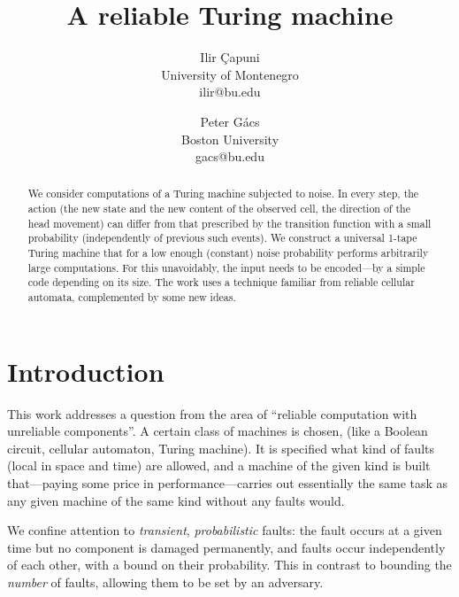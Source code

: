 \documentclass[11pt]{memoir}
\theoremstyle{definition} %
\begin{document}
\title{A reliable Turing machine}

\author{Ilir \c{C}apuni 
\\ University of Montenegro
\\ ilir@bu.edu
\and
Peter G\'acs
\\ Boston University
\\ gacs@bu.edu
}
\maketitle

\begin{abstract}
  We consider computations of a Turing machine subjected to noise.
  In every step, the action (the new state and the new content of the observed
  cell, the direction of the head movement) can differ from that prescribed by
  the transition function with a small probability (independently of previous
  such events).  We construct a universal 1-tape Turing machine that for a low enough
  (constant) noise probability performs arbitrarily large computations.  For
  this unavoidably, the input needs to be encoded---by a simple code depending
  on its size.  The work uses a technique familiar from reliable cellular
  automata, complemented by some new ideas.
\end{abstract}

\newpage


\section{Introduction}

This work addresses a question from the area of ``reliable computation with unreliable components''.
A certain class of machines is chosen, (like a Boolean circuit, cellular automaton, Turing machine).
It is specified what kind of faults (local in space and time)
are allowed, and a machine of the given
kind is built that---paying some price in performance---carries out essentially the same
task as any given machine of the same kind without any faults would.

We confine attention to \emph{transient}, \emph{probabilistic} faults:
the fault occurs at a given time but no component is damaged permanently,
and faults occur independently of each other, with a bound on their probability.
This in contrast to bounding the \emph{number} of faults, allowing them to be set by an adversary.
\end{document}
